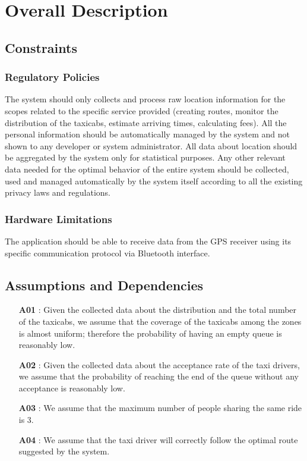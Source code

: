 \chapter{Overall Description} \label{chap2}

\section{Constraints}
\subsection{Regulatory Policies}
The system should only collects and process raw location information for the scopes related to the specific service provided (creating routes, monitor the distribution of the taxicabs, estimate arriving times, calculating fees). All the personal information should be automatically managed by the system and not shown to any developer or system administrator. All data about location should be aggregated by the system only for statistical purposes. 
Any other relevant data needed for the optimal behavior of the entire system should be collected, used and managed automatically by the system itself according to all the existing privacy laws and regulations.  

\subsection{Hardware Limitations}
The application should be able to receive data from the GPS receiver using its specific communication protocol via Bluetooth interface. 

\section{Assumptions and Dependencies} \label{assump}
\begin{itemize}
	\item [\textbf{A01}]: Given the collected data about the distribution and the total number of the taxicabs, we assume that the coverage of the taxicabs among the zones is almost uniform; therefore the probability of having an empty queue is reasonably low.
	\item [\textbf{A02}]: Given the collected data about the acceptance rate of the taxi drivers, we assume that the probability of reaching the end of the queue without any acceptance is reasonably low.
	\item [\textbf{A03}]: We assume that the maximum number of people sharing the same ride is 3.
	\item [\textbf{A04}]: We assume that the taxi driver will correctly follow the optimal route suggested by the system.
\end{itemize}


